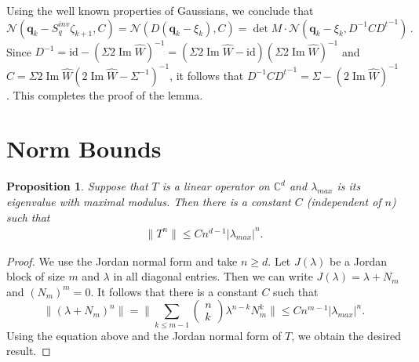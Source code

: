 \documentclass[12pt]{article}
\newtheorem{proposition}[theorem]{Proposition}
\renewcommand{\Im}{\operatorname{Im}}
\newcommand{\id}{\mathrm{id}}
\begin{document}
	Using the well known properties of Gaussians, we conclude that
	$$\mathcal N(\mathbf{q}_k - S^{inv}_q\zeta_{k+1},C)=\mathcal N(D(\mathbf{q}_k - \xi_{k}),C)=\det M 
	\cdot \mathcal N(\mathbf{q}_k - \xi_{k},D^{-1}C{D^t}^{-1})\,.$$
	Since $D^{-1}=\id-(\Sigma2\Im\widehat W)^{-1}=(\Sigma2\Im\widehat W-\id)(\Sigma2\Im\widehat W)^{-1}$ and $C=\Sigma2\Im\widehat W(2\Im\widehat W -\Sigma^{-1})^{-1}$, it follows that
 $ D^{-1}C{D^t}^{-1}=\Sigma-(2\Im \widehat W)^{-1}$. 	
This completes the proof of the lemma.

\section{Norm Bounds}\label{NB}

\begin{proposition}\label{prop:NB}
Suppose that $T$ is a linear operator on $ \mathbb{C}^{d} $  and $\lambda_{max} $ is its eigenvalue with maximal modulus.  Then there is a constant $C$ (independent of $n$) such that 
\begin{align}
\|  T^n \| \leq C n^{d-1}  |\lambda_{max}  |^n. 
\end{align}
\end{proposition}

\begin{proof} We use the Jordan normal form and take $n \geq d$. 
 Let  $  J(\lambda ) $ be a Jordan block of size $m$ and $\lambda$ in all diagonal entries. Then we can write  
 $J (\lambda) =   \lambda +   N_m  $ and $(N_m)^{m} = 0$.   It follows that there is a constant $C$ such that
$$
\|  (\lambda +   N_m)^n\| =  \Big  \| \sum_{k  \leq m-1 }  \begin{pmatrix}
  n \\ k    
  \end{pmatrix}   \lambda^{n-k} N_m^{ k } \Big \|  \leq C  n^{m-1} |\lambda_{max}  |^n. 
$$ 
Using the equation above and the Jordan normal form of $T$, we obtain the desired result. 
\end{proof}

	
\end{document}
